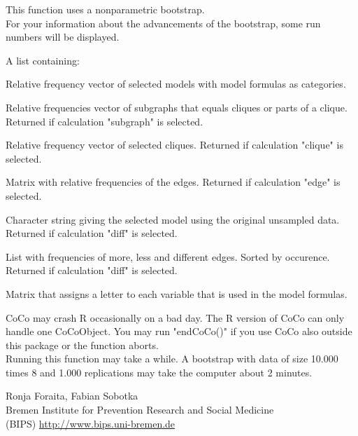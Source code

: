 \begin{Details}\relax
This function uses a nonparametric bootstrap.\\
For your information about the advancements of the bootstrap, some run numbers will be displayed.
\end{Details}
\begin{Value}
A list containing:
\begin{ldescription}
\item[\code{"bootstrapped models" }] Relative frequency vector of selected models with model formulas as categories. 
\item[\code{"bootstrapped subgraphs" }] Relative frequencies vector of subgraphs that equals cliques or parts of a clique.
Returned if calculation "subgraph" is selected.

\item[\code{"bootstrapped cliques" }] Relative frequency vector of selected cliques. Returned if calculation "clique" is selected.

\item[\code{"bootstrapped edges"}] Matrix with relative frequencies of the edges. Returned if calculation "edge" is selected. 
\item[\code{"original model"}] Character string giving the selected model using the original unsampled data. Returned if calculation "diff" is selected. 
\item[\code{"differences from original data set"}] List with frequencies of more, less and different edges.
Sorted by occurence.
Returned if calculation "diff" is selected. 
\item[\code{"variable names"}] Matrix that assigns a letter to each variable that is used in the model formulas. 
\end{ldescription}
\end{Value}
\begin{Note}\relax
CoCo may crash R occasionally on a bad day. The R version of CoCo can only handle one CoCoObject.
You may run "endCoCo()" if you use CoCo also outside this package or the function aborts.\\ 
Running this function may take a while. A bootstrap with
data of size 10.000 times 8 and 1.000 replications may take the computer about 2 minutes.
\end{Note}
\begin{Author}\relax
Ronja Foraita, Fabian Sobotka \\
Bremen Institute for Prevention Research and Social Medicine \\
(BIPS)  \url{http://www.bips.uni-bremen.de}
\end{Author}

